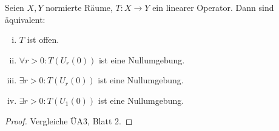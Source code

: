 \documentclass[ngerman]{report}
\begin{document}
	\begin{lemma}
		Seien $X,Y$ normierte Räume, $T: X\to Y$ ein linearer Operator. Dann sind äquivalent:
			\begin{enumerate}[(i)]
				\item $T$ ist offen.
				\item $\forall r > 0: T(U_r(0))$ ist eine Nullumgebung.
				\item $\exists r > 0 : T(U_r(0))$ ist eine Nullumgebung.
				\item $\exists r > 0 : T(U_1(0))$ ist eine Nullumgebung.

			\end{enumerate}
	\end{lemma}
	\begin{proof}
	 Vergleiche ÜA3, Blatt 2.
	\end{proof}
\end{document}
